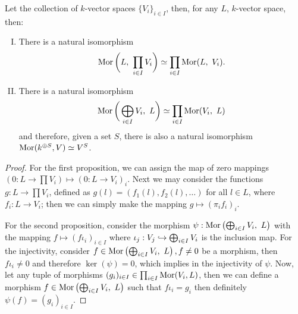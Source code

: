 \begin{proposition}
    Let the collection of \(k\)-vector spaces \(\{V_i\}_{i \in I}\), then, for any
    \(L\), \(k\)-vector space, then:
    \begin{enumerate}[I.]
        \item There is a natural isomorphism
              \[
                  \operatorname{Mor} \bigg( L,\ \prod_{i \in I} V_i \bigg) \simeq \prod_{i \in
                      I} \operatorname{Mor}(L,\ V_i).
              \]
        \item There is a natural isomorphism
              \[
                  \operatorname{Mor}\bigg( \bigoplus_{i \in I} V_i,\ L \bigg) \simeq
                  \prod_{i \in I} \operatorname{Mor}(V_i,\ L)
              \]
              and therefore, given a set \(S\), there is also a natural isomorphism
              \(\operatorname{Mor}(k^{\oplus S}, V) \simeq V^S\).
    \end{enumerate}
\end{proposition}

\begin{proof}
    For the first proposition, we can assign the map of zero mappings \((0 : L \to
    \prod V_i) \longmapsto (0 : L \to V_i)_i\). Next we may consider the functions
    \(g : L \to \prod V_i\), defined as \(g(l) = (f_1(l), f_2(l), \dots)\) for all
    \(l \in L\), where \(f_i : L \to V_i\); then we can simply make the mapping
    \(g \longmapsto (\pi_i  f_i)_i\).

    For the second proposition, consider the morphism \(\psi : \operatorname{Mor}\left(
    \bigoplus_{i \in I} V_i,\ L \right) \) with the mapping \(f \mapsto (f
    \iota_i)_{i \in I}\) where \(\iota_j: V_j \hookrightarrow \bigoplus_{i \in
        I} V_i\) is the inclusion map. For the injectivity, consider \(f \in
    \operatorname{Mor}\left( \bigoplus_{i \in I} V_i,\ L \right), f \neq 0\) be a morphism,
    then \(f  \iota_i \neq 0\) and therefore \(\ker(\psi) = 0\), which
    implies in the injectivity of \(\psi\). Now, let any tuple of morphisms
    \((g_i)_{i \in I} \in \prod_{i \in I} \operatorname{Mor}(V_i, L)\), then we can define a
    morphism \(f \in \operatorname{Mor}\left( \bigoplus_{i \in I} V_i,\ L \right)\) such that
    \(f  \iota_i = g_i\) then definitely \(\psi(f) = (g_i)_{i \in I}\).
\end{proof}

